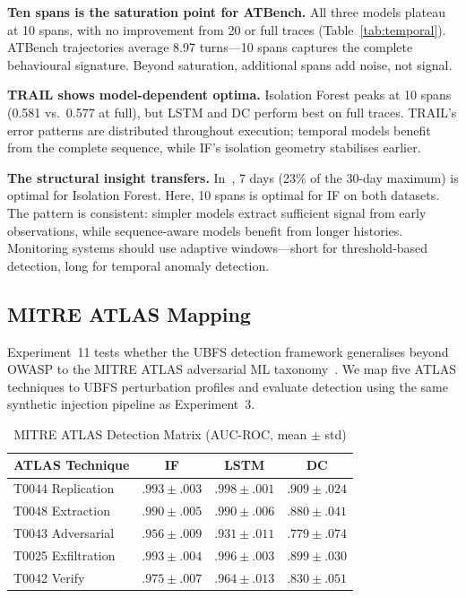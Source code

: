 \documentclass[conference]{IEEEtran}
\begin{document}
\textbf{Ten spans is the saturation point for ATBench.} All three models plateau at 10 spans, with no improvement from 20 or full traces (Table~\ref{tab:temporal}). ATBench trajectories average 8.97 turns---10 spans captures the complete behavioural signature. Beyond saturation, additional spans add noise, not signal.

\textbf{TRAIL shows model-dependent optima.} Isolation Forest peaks at 10 spans (0.581 vs.\ 0.577 at full), but LSTM and DC perform best on full traces. TRAIL's error patterns are distributed throughout execution; temporal models benefit from the complete sequence, while IF's isolation geometry stabilises earlier.

\textbf{The structural insight transfers.} In~\cite{rimal2026insider}, 7 days (23\% of the 30-day maximum) is optimal for Isolation Forest. Here, 10 spans is optimal for IF on both datasets. The pattern is consistent: simpler models extract sufficient signal from early observations, while sequence-aware models benefit from longer histories. Monitoring systems should use adaptive windows---short for threshold-based detection, long for temporal anomaly detection.

\subsection{MITRE ATLAS Mapping}
\label{sec:atlas}

Experiment~11 tests whether the UBFS detection framework generalises beyond OWASP to the MITRE ATLAS adversarial ML taxonomy~\cite{mitre2024atlas}. We map five ATLAS techniques to UBFS perturbation profiles and evaluate detection using the same synthetic injection pipeline as Experiment~3.

\begin{table}[htbp]
\caption{MITRE ATLAS Detection Matrix (AUC-ROC, mean $\pm$ std)}
\label{tab:atlas}
\centering
\small
\begin{tabular}{@{}lccc@{}}
\toprule
\textbf{ATLAS Technique} & \textbf{IF} & \textbf{LSTM} & \textbf{DC} \\
\midrule
T0044 Replication & $.993{\pm}.003$ & $.998{\pm}.001$ & $.909{\pm}.024$ \\
T0048 Extraction  & $.990{\pm}.005$ & $.990{\pm}.006$ & $.880{\pm}.041$ \\
T0043 Adversarial & $.956{\pm}.009$ & $.931{\pm}.011$ & $.779{\pm}.074$ \\
T0025 Exfiltration & $.993{\pm}.004$ & $.996{\pm}.003$ & $.899{\pm}.030$ \\
T0042 Verify      & $.975{\pm}.007$ & $.964{\pm}.013$ & $.830{\pm}.051$ \\
\bottomrule
\end{tabular}
\end{table}
\end{document}
